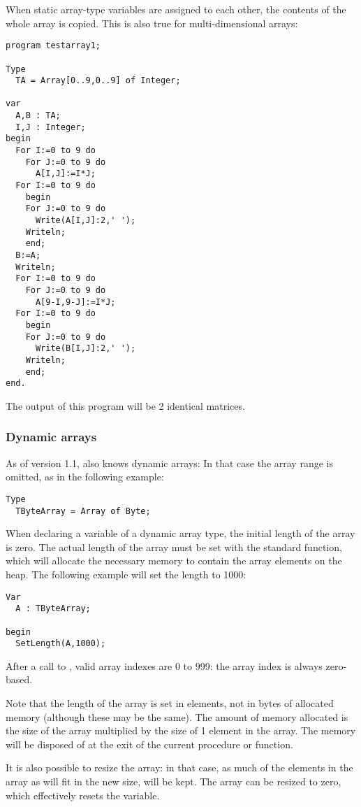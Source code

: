 When static array-type variables are assigned to each other, the contents of the
whole array is copied. This is also true for multi-dimensional arrays:
\begin{verbatim}
program testarray1;

Type
  TA = Array[0..9,0..9] of Integer;
  
var   
  A,B : TA;
  I,J : Integer;
begin
  For I:=0 to 9 do
    For J:=0 to 9 do 
      A[I,J]:=I*J;
  For I:=0 to 9 do
    begin
    For J:=0 to 9 do 
      Write(A[I,J]:2,' ');
    Writeln;
    end;
  B:=A;
  Writeln;
  For I:=0 to 9 do
    For J:=0 to 9 do 
      A[9-I,9-J]:=I*J;
  For I:=0 to 9 do
    begin
    For J:=0 to 9 do 
      Write(B[I,J]:2,' ');
    Writeln;
    end;
end.  
\end{verbatim}
The output of this program will be 2 identical matrices.

\subsubsection{Dynamic arrays}
As of version 1.1, \fpc also knows dynamic arrays: In that case the array
range is omitted, as in the following example:
\begin{verbatim}
Type
  TByteArray = Array of Byte;
\end{verbatim}
When declaring a variable of a dynamic array type, the initial length of the
array is zero. The actual length of the array must be set with the standard
 function, which will allocate the necessary memory to contain 
the array elements on the heap. The following example will set the length to
1000:
\begin{verbatim}
Var 
  A : TByteArray;

begin
  SetLength(A,1000);
\end{verbatim}
After a call to , valid array indexes are 0 to 999: the array
index is always zero-based.

Note that the length of the array is set in elements, not in bytes of 
allocated memory (although these may be the same). The amount of 
memory allocated is the size of the array multiplied by the size of 
1 element in the array. The memory will be disposed of at the exit of the
current procedure or function. 

It is also possible to resize the array: in that case, as much of the 
elements in the array as will fit in the new size, will be kept. The array
can be resized to zero, which effectively resets the variable.

